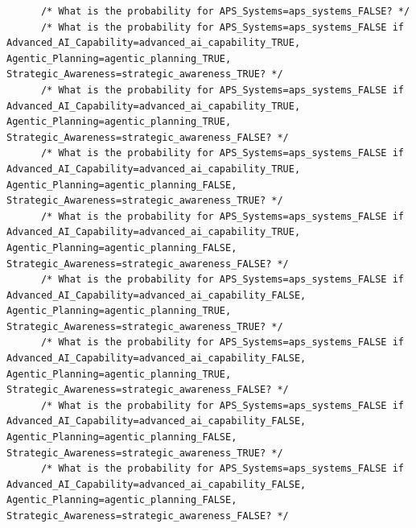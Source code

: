 \documentclass[
  11pt,
  letterpaper,
]{book}
\begin{document}
\begin{verbatim}
      /* What is the probability for APS_Systems=aps_systems_FALSE? */
      /* What is the probability for APS_Systems=aps_systems_FALSE if Advanced_AI_Capability=advanced_ai_capability_TRUE, Agentic_Planning=agentic_planning_TRUE, Strategic_Awareness=strategic_awareness_TRUE? */
      /* What is the probability for APS_Systems=aps_systems_FALSE if Advanced_AI_Capability=advanced_ai_capability_TRUE, Agentic_Planning=agentic_planning_TRUE, Strategic_Awareness=strategic_awareness_FALSE? */
      /* What is the probability for APS_Systems=aps_systems_FALSE if Advanced_AI_Capability=advanced_ai_capability_TRUE, Agentic_Planning=agentic_planning_FALSE, Strategic_Awareness=strategic_awareness_TRUE? */
      /* What is the probability for APS_Systems=aps_systems_FALSE if Advanced_AI_Capability=advanced_ai_capability_TRUE, Agentic_Planning=agentic_planning_FALSE, Strategic_Awareness=strategic_awareness_FALSE? */
      /* What is the probability for APS_Systems=aps_systems_FALSE if Advanced_AI_Capability=advanced_ai_capability_FALSE, Agentic_Planning=agentic_planning_TRUE, Strategic_Awareness=strategic_awareness_TRUE? */
      /* What is the probability for APS_Systems=aps_systems_FALSE if Advanced_AI_Capability=advanced_ai_capability_FALSE, Agentic_Planning=agentic_planning_TRUE, Strategic_Awareness=strategic_awareness_FALSE? */
      /* What is the probability for APS_Systems=aps_systems_FALSE if Advanced_AI_Capability=advanced_ai_capability_FALSE, Agentic_Planning=agentic_planning_FALSE, Strategic_Awareness=strategic_awareness_TRUE? */
      /* What is the probability for APS_Systems=aps_systems_FALSE if Advanced_AI_Capability=advanced_ai_capability_FALSE, Agentic_Planning=agentic_planning_FALSE, Strategic_Awareness=strategic_awareness_FALSE? */

\end{verbatim}
\end{document}
